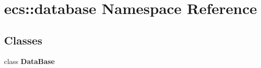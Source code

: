 \section{ecs\+:\+:database Namespace Reference}
\label{namespaceecs_1_1database}
\subsection*{Classes}
\begin{DoxyCompactItemize}
\item 
class {\bf Data\+Base}
\end{DoxyCompactItemize}
